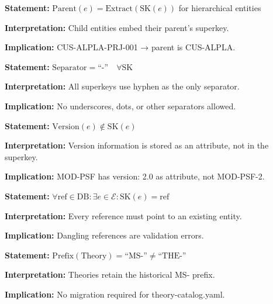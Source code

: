 \begin{tcolorbox}[colback=gray!5!white, colframe=gray!75!black,
    title=Axiom SK-4: Hierarchical Embedding]
\textbf{Statement:} $\text{Parent}(e) = \text{Extract}(\text{SK}(e))$ for hierarchical entities

\textbf{Interpretation:} Child entities embed their parent's superkey.

\textbf{Implication:} CUS-ALPLA-PRJ-001 → parent is CUS-ALPLA.
\end{tcolorbox}

\begin{tcolorbox}[colback=gray!5!white, colframe=gray!75!black,
    title=Axiom SK-5: Separator Consistency]
\textbf{Statement:} $\text{Separator} = \text{``-''} \quad \forall \text{SK}$

\textbf{Interpretation:} All superkeys use hyphen as the only separator.

\textbf{Implication:} No underscores, dots, or other separators allowed.
\end{tcolorbox}

\begin{tcolorbox}[colback=gray!5!white, colframe=gray!75!black,
    title=Axiom SK-6: Version Externality]
\textbf{Statement:} $\text{Version}(e) \notin \text{SK}(e)$

\textbf{Interpretation:} Version information is stored as an attribute, not in the superkey.

\textbf{Implication:} MOD-PSF has version: 2.0 as attribute, not MOD-PSF-2.
\end{tcolorbox}

\begin{tcolorbox}[colback=gray!5!white, colframe=gray!75!black,
    title=Axiom SK-7: Reference Validity]
\textbf{Statement:} $\forall \text{ref} \in \text{DB}: \exists e \in \mathcal{E}: \text{SK}(e) = \text{ref}$

\textbf{Interpretation:} Every reference must point to an existing entity.

\textbf{Implication:} Dangling references are validation errors.
\end{tcolorbox}

\begin{tcolorbox}[colback=gray!5!white, colframe=gray!75!black,
    title=Axiom SK-8: Historical Exception]
\textbf{Statement:} $\text{Prefix}(\text{Theory}) = \text{``MS-''} \neq \text{``THE-''}$

\textbf{Interpretation:} Theories retain the historical MS- prefix.

\textbf{Implication:} No migration required for theory-catalog.yaml.
\end{tcolorbox}

